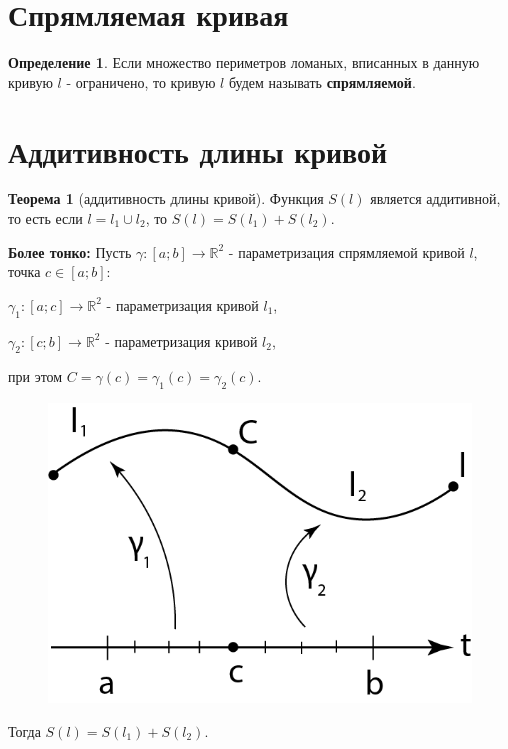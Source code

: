 \documentclass{report}
\theoremstyle{definition}
\newtheorem*{definition}{Определение}
\newtheorem*{theorem}{Теорема}
\begin{document}
\section{Спрямляемая кривая}

\begin{definition}
    Если множество периметров ломаных, вписанных в данную кривую $l$ - ограничено, то кривую $l$
    будем называть \textbf{спрямляемой}.
\end{definition}

\section{Аддитивность длины кривой}

\begin{theorem}[аддитивность длины кривой]
    Функция $S(l)$ является аддитивной, то есть если $l = l_1 \cup l_2$, то $S(l) = S(l_1) + S(l_2)$.

    \textbf{Более тонко:} Пусть $\gamma:[a;b]\rightarrow\mathbb{R}^2$ - параметризация спрямляемой кривой
    $l$, точка $c \in [a;b]$:

    $\gamma_1:[a;c] \rightarrow \mathbb{R}^2$ - параметризация кривой $l_1$,

    $\gamma_2:[c;b] \rightarrow \mathbb{R}^2$ - параметризация кривой $l_2$,

    при этом $C = \gamma(c) = \gamma_1(c) = \gamma_2(c)$.
    \begin{figure}[H]
        \begin{center}
            \includegraphics[scale=0.2]{graph12.png}\label{figure12}
        \end{center}
    \end{figure}

    Тогда $S(l) = S(l_1) + S(l_2)$.
\end{theorem}
\end{document}
